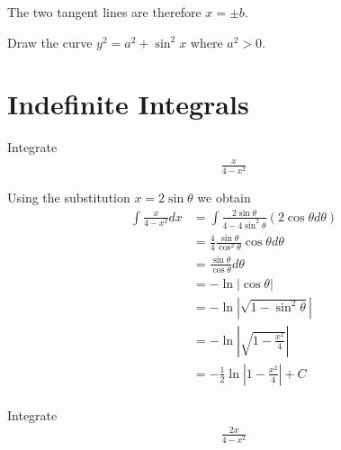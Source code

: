 \documentclass[a4paper]{article}
\begin{document}
The two tangent lines are therefore \(x = \pm b\).  

\begin{question}
	Draw the curve \(y^2 = a^2 + \sin^2 x\) where \(a^2 > 0\).
\end{question}

\begin{center}
\end{center}

\section{Indefinite Integrals}

\begin{question}
	Integrate
	\begin{align*}
		\frac{x}{4-x^2}
	\end{align*}
\end{question}

Using the substitution \(x = 2\sin \theta\) we obtain
\begin{align*}
	\int \frac{x}{4-x^2}dx &= \int \frac{2\sin\theta}{4-4\sin^2\theta}(2\cos\theta d\theta) \\
		&= \frac{4}{4} \frac{\sin\theta}{\cos^2\theta}{\cos\theta d\theta} \\
		&= \frac{\sin\theta}{\cos\theta}d\theta \\
		&= -\ln|\cos\theta| \\
		&= -\ln|\sqrt{1 - \sin^2\theta}| \\
		&= -\ln\left|\sqrt{1 - \frac{x^2}{4}}\right| \\
		&= -\frac{1}{2} \ln\left|1 - \frac{x^2}{4}\right| + C \\
\end{align*}

\begin{question}
	Integrate
\begin{align*}
	\frac{2x}{4-x^2}
\end{align*}
\end{question}
\end{document}
